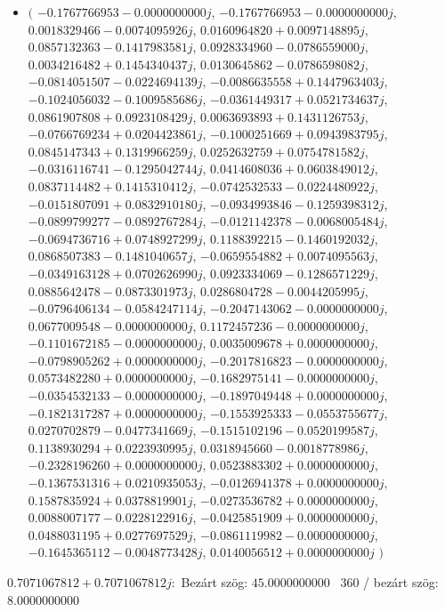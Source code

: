 \documentclass[14pt,a4paper]{article}
\begin{document}
\begin{itemize}
\item
$\big($
$-0.1767766953-0.0000000000j$, $-0.1767766953-0.0000000000j$, $0.0018329466-0.0074095926j$, $0.0160964820+0.0097148895j$, $0.0857132363-0.1417983581j$, $0.0928334960-0.0786559000j$, $0.0034216482+0.1454340437j$, $0.0130645862-0.0786598082j$, $-0.0814051507-0.0224694139j$, $-0.0086635558+0.1447963403j$, $-0.1024056032-0.1009585686j$, $-0.0361449317+0.0521734637j$, $0.0861907808+0.0923108429j$, $0.0063693893+0.1431126753j$, $-0.0766769234+0.0204423861j$, $-0.1000251669+0.0943983795j$, $0.0845147343+0.1319966259j$, $0.0252632759+0.0754781582j$, $-0.0316116741-0.1295042744j$, $0.0414608036+0.0603849012j$, $0.0837114482+0.1415310412j$, $-0.0742532533-0.0224480922j$, $-0.0151807091+0.0832910180j$, $-0.0934993846-0.1259398312j$, $-0.0899799277-0.0892767284j$, $-0.0121142378-0.0068005484j$, $-0.0694736716+0.0748927299j$, $0.1188392215-0.1460192032j$, $0.0868507383-0.1481040657j$, $-0.0659554882+0.0074095563j$, $-0.0349163128+0.0702626990j$, $0.0923334069-0.1286571229j$, $0.0885642478-0.0873301973j$, $0.0286804728-0.0044205995j$, $-0.0796406134-0.0584247114j$, $-0.2047143062-0.0000000000j$, $0.0677009548-0.0000000000j$, $0.1172457236-0.0000000000j$, $-0.1101672185-0.0000000000j$, $0.0035009678+0.0000000000j$, $-0.0798905262+0.0000000000j$, $-0.2017816823-0.0000000000j$, $0.0573482280+0.0000000000j$, $-0.1682975141-0.0000000000j$, $-0.0354532133-0.0000000000j$, $-0.1897049448+0.0000000000j$, $-0.1821317287+0.0000000000j$, $-0.1553925333-0.0553755677j$, $0.0270702879-0.0477341669j$, $-0.1515102196-0.0520199587j$, $0.1138930294+0.0223930995j$, $0.0318945660-0.0018778986j$, $-0.2328196260+0.0000000000j$, $0.0523883302+0.0000000000j$, $-0.1367531316+0.0210935053j$, $-0.0126941378+0.0000000000j$, $0.1587835924+0.0378819901j$, $-0.0273536782+0.0000000000j$, $0.0088007177-0.0228122916j$, $-0.0425851909+0.0000000000j$, $0.0488031195+0.0277697529j$, $-0.0861119982-0.0000000000j$, $-0.1645365112-0.0048773428j$, $0.0140056512+0.0000000000j$
$\big)$
\end{itemize}
$0.7071067812+0.7071067812j$:\
Bezárt szög: $45.0000000000$ \
360 / bezárt szög: $8.0000000000$\
\end{document}
